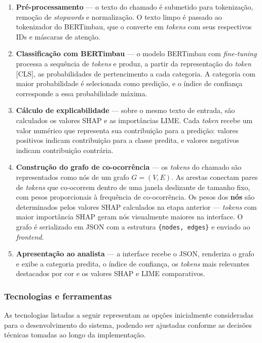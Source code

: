\documentclass[
    12pt,                %
    openright,           %
    oneside,             %
    a4paper,             %
    english,             %
    brazil               %
]{abntex2}
\begin{document}
\begin{enumerate}
    \item \textbf{Pré-processamento} — o texto do chamado é submetido para tokenização, remoção de \textit{stopwords} e normalização. O texto limpo é passado ao tokenizador do BERTimbau, que o converte em \textit{tokens} com seus respectivos IDs e máscaras de atenção.

    \item \textbf{Classificação com BERTimbau} — o modelo BERTimbau com \textit{fine-tuning} processa a sequência de \textit{tokens} e produz, a partir da representação do \textit{token} [CLS], as probabilidades de pertencimento a cada categoria. A categoria com maior probabilidade é selecionada como predição, e o índice de confiança corresponde a essa probabilidade máxima.

    \item \textbf{Cálculo de explicabilidade} — sobre o mesmo texto de entrada, são calculados os valores SHAP e as importâncias LIME. Cada \textit{token} recebe um valor numérico que representa sua contribuição para a predição: valores positivos indicam contribuição para a classe predita, e valores negativos indicam contribuição contrária.

    \item \textbf{Construção do grafo de co-ocorrência} — os \textit{tokens} do chamado são representados como nós de um grafo $G = (V, E)$. As arestas conectam pares de \textit{tokens} que co-ocorrem dentro de uma janela deslizante de tamanho fixo, com pesos proporcionais à frequência de co-ocorrência. Os pesos dos \textbf{nós} são determinados pelos valores SHAP calculados na etapa anterior — \textit{tokens} com maior importância SHAP geram nós visualmente maiores na interface. O grafo é serializado em JSON com a estrutura \texttt{\{nodes, edges\}} e enviado ao \textit{frontend}.

    \item \textbf{Apresentação ao analista} — a interface recebe o JSON, renderiza o grafo e exibe a categoria predita, o índice de confiança, os \textit{tokens} mais relevantes destacados por cor e os valores SHAP e LIME comparativos.
\end{enumerate}

\subsubsection{Tecnologias e ferramentas}

As tecnologias listadas a seguir representam as opções inicialmente 
consideradas para o desenvolvimento do sistema, podendo ser ajustadas 
conforme as decisões técnicas tomadas ao longo da implementação.
\end{document}
